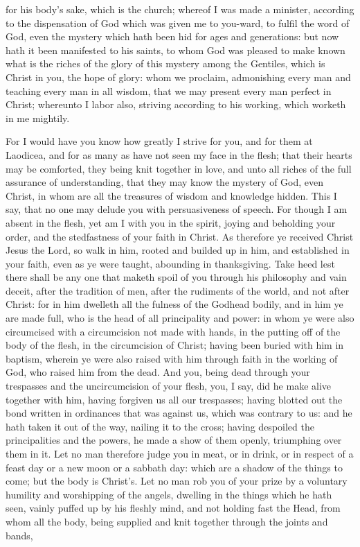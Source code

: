 for his body’s sake, which is the church; whereof I was made a minister, according to the dispensation of God which was given me to you-ward, to fulfil the word of God, even the mystery which hath been hid for ages and generations: but now hath it been manifested to his saints, to whom God was pleased to make known what is the riches of the glory of this mystery among the Gentiles, which is Christ in you, the hope of glory: whom we proclaim, admonishing every man and teaching every man in all wisdom, that we may present every man perfect in Christ; whereunto I labor also, striving according to his working, which worketh in me mightily. 

For I would have you know how greatly I strive for you, and for them at Laodicea, and for as many as have not seen my face in the flesh; that their hearts may be comforted, they being knit together in love, and unto all riches of the full assurance of understanding, that they may know the mystery of God, even Christ, in whom are all the treasures of wisdom and knowledge hidden. This I say, that no one may delude you with persuasiveness of speech. For though I am absent in the flesh, yet am I with you in the spirit, joying and beholding your order, and the stedfastness of your faith in Christ.  As therefore ye received Christ Jesus the Lord, so walk in him, rooted and builded up in him, and established in your faith, even as ye were taught, abounding in thanksgiving.  Take heed lest there shall be any one that maketh spoil of you through his philosophy and vain deceit, after the tradition of men, after the rudiments of the world, and not after Christ: for in him dwelleth all the fulness of the Godhead bodily, and in him ye are made full, who is the head of all principality and power: in whom ye were also circumcised with a circumcision not made with hands, in the putting off of the body of the flesh, in the circumcision of Christ; having been buried with him in baptism, wherein ye were also raised with him through faith in the working of God, who raised him from the dead. And you, being dead through your trespasses and the uncircumcision of your flesh, you, I say, did he make alive together with him, having forgiven us all our trespasses; having blotted out the bond written in ordinances that was against us, which was contrary to us: and he hath taken it out of the way, nailing it to the cross; having despoiled the principalities and the powers, he made a show of them openly, triumphing over them in it.  Let no man therefore judge you in meat, or in drink, or in respect of a feast day or a new moon or a sabbath day: which are a shadow of the things to come; but the body is Christ’s. Let no man rob you of your prize by a voluntary humility and worshipping of the angels, dwelling in the things which he hath seen, vainly puffed up by his fleshly mind, and not holding fast the Head, from whom all the body, being supplied and knit together through the joints and bands, 